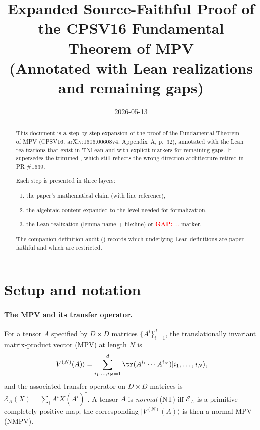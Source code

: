 \documentclass{article}
\title{Expanded Source-Faithful Proof of the CPSV16 Fundamental Theorem of MPV\\
       (Annotated with Lean realizations and remaining gaps)}
\author{}
\date{2026-05-13}
\newcommand{\gap}[1]{\textcolor{red}{\textbf{GAP:} #1}}
\theoremstyle{plain}
\begin{document}
\maketitle

\begin{abstract}
    This document is a step-by-step expansion of the proof of the Fundamental
    Theorem of MPV (CPSV16, arXiv:1606.00608v4, Appendix~A, p.~32), annotated
    with the Lean realizations that exist in TNLean and with explicit markers
    for remaining gaps. It supersedes the trimmed
    , which
    still reflects the wrong-direction architecture retired in PR \#1639.

    Each step is presented in three layers:
    \begin{enumerate}
        \item the paper's mathematical claim (with line reference),
        \item the algebraic content expanded to the level needed for formalization,
        \item the Lean realization (lemma name + file:line) or \gap{...} marker.
    \end{enumerate}

    The companion definition audit
    () records which
    underlying Lean definitions are paper-faithful and which are restricted.
\end{abstract}

\tableofcontents

\section{Setup and notation}
\label{sec:setup}

\paragraph{The MPV and its transfer operator.}
For a tensor $A$ specified by $D \times D$ matrices $\{A^i\}_{i=1}^d$, the
translationally invariant matrix-product vector (MPV) at length $N$ is
\begin{align}
    |V^{(N)}(A)\rangle
    = \sum_{i_1,\ldots,i_N=1}^{d} \tr(A^{i_1} \cdots A^{i_N})
    |i_1, \ldots, i_N\rangle,
    \label{eq:mpv-def}
\end{align}
and the associated transfer operator on $D \times D$ matrices is
$\mathcal{E}_A(X) = \sum_i A^i X (A^i)^\dagger$. A tensor $A$ is
\emph{normal} (NT) iff $\mathcal{E}_A$ is a primitive completely positive
map; the corresponding $|V^{(N)}(A)\rangle$ is then a normal MPV (NMPV).
\end{document}
